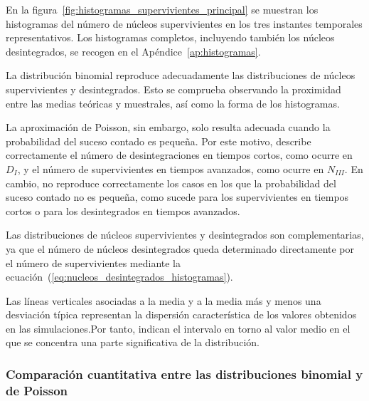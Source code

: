 \documentclass[12pt,a4paper]{article}
\begin{document}
En la figura~\ref{fig:histogramas_supervivientes_principal} se muestran los histogramas del número de núcleos supervivientes en los tres instantes temporales representativos. Los histogramas completos, incluyendo también los núcleos desintegrados, se recogen en el Apéndice~\ref{ap:histogramas}.

La distribución binomial reproduce adecuadamente las distribuciones de núcleos supervivientes y desintegrados. Esto se comprueba observando la proximidad entre las medias teóricas y muestrales, así como la forma de los histogramas.

La aproximación de Poisson, sin embargo, solo resulta adecuada cuando la probabilidad del suceso contado es pequeña. Por este motivo, describe correctamente el número de desintegraciones en tiempos cortos, como ocurre en $D_I$, y el número de supervivientes en tiempos avanzados, como ocurre en $N_{III}$. En cambio, no reproduce correctamente los casos en los que la probabilidad del suceso contado no es pequeña, como sucede para los supervivientes en tiempos cortos o para los desintegrados en tiempos avanzados.

Las distribuciones de núcleos supervivientes y desintegrados son complementarias, ya que el número de núcleos desintegrados queda determinado directamente por el número de supervivientes mediante la ecuación~(\ref{eq:nucleos_desintegrados_histogramas}).

Las líneas verticales asociadas a la media y a la media más y menos una desviación típica representan la dispersión característica de los valores obtenidos en las simulaciones.Por tanto, indican el intervalo en torno al valor medio en el que se concentra una parte significativa de la distribución.

\subsubsection{Comparación cuantitativa entre las distribuciones binomial y de Poisson}

\begin{table}[H]
\centering
\resizebox{\textwidth}{!}{%

}
\caption{Comparación entre las simulaciones Monte Carlo y la distribución binomial.}
\label{tab:comparacion_binomial}
\end{table}

\begin{table}[H]
\centering
\resizebox{\textwidth}{!}{%

}
\caption{Comparación entre las simulaciones Monte Carlo y la aproximación de Poisson.}
\label{tab:comparacion_poisson}
\end{table}
\end{document}
